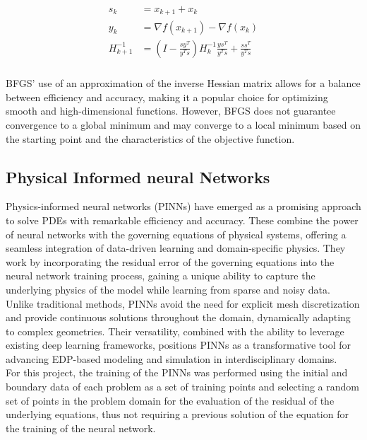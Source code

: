 \documentclass[12pt,letterpaper]{article}
\begin{document}
\begin{align}
  \label{Eq:Hess}
  \begin{split}
    s_k & =  x_{k+1} + x_{k}\\
    y_k & = \nabla f(x_{k+1}) - \nabla f(x_{k})\\
    H_{k+1}^{-1} & = (I-\frac{sy^T}{y^Ts})H_{k}^{-1}\frac{ys^T}{y^Ts} + \frac{ss^T}{y^Ts} 
  \end{split}
\end{align}\\
BFGS' use of an approximation of the inverse Hessian matrix allows for a balance between efficiency and accuracy, making it a popular choice for optimizing smooth and high-dimensional functions. However, BFGS does not guarantee convergence to a global minimum and may converge to a local minimum based on the starting point and the characteristics of the objective function. 

\subsection{Physical Informed neural Networks}

Physics-informed neural networks (PINNs) have emerged as a promising approach to solve PDEs with remarkable efficiency and accuracy. These combine the power of neural networks with the governing equations of physical systems, offering a seamless integration of data-driven learning and domain-specific physics. They work by incorporating the residual error of the governing equations into the neural network training process, gaining a unique ability to capture the underlying physics of the model while learning from sparse and noisy data\cite{raissi2019physics}. \\

Unlike traditional methods, PINNs avoid the need for explicit mesh discretization and provide continuous solutions throughout the domain, dynamically adapting to complex geometries. Their versatility, combined with the ability to leverage existing deep learning frameworks, positions PINNs as a transformative tool for advancing EDP-based modeling and simulation in interdisciplinary domains.\\

For this project, the training of the PINNs was performed using the initial and boundary data of each problem as a set of training points and selecting a random set of points in the problem domain for the evaluation of the residual of the underlying equations, thus not requiring a previous solution of the equation for the training of the neural network.
\end{document}
